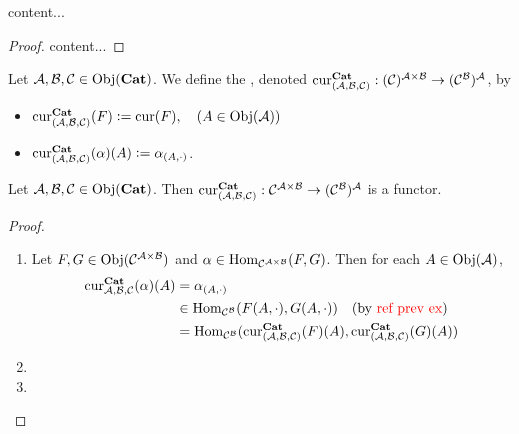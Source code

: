 \documentclass{book}
\begin{document}
	
	
	
	
	
	
	
	
	
	
	
	
	
	
	\begin{defn}
		
	\end{defn}
	
	\begin{ex}
		content...
	\end{ex}
	
	\begin{proof}
		content...
	\end{proof}
	
	\begin{defn}
		Let $\MA, \MB, \MC \in \Obj(\bCat)$. We define the , denoted $\cur^{\bCat}_{(\MA,\MB, \MC)}: (\MC)^{\MA \times \MB} \rightarrow (\MC^{\MB})^{\MA}$, by 
		\begin{itemize}
			\item $\cur^{\bCat}_{(\MA,\MB, \MC)}(F) \defeq \cur(F), \quad (A \in \Obj(\MA))$
			\item $\cur^{\bCat}_{(\MA,\MB, \MC)}(\al)(A) \defeq \al_{(A, \cdot)}$.
		\end{itemize}
	\end{defn}
	
	\begin{ex}
		Let $\MA, \MB, \MC \in \Obj(\bCat)$. Then $\cur^{\bCat}_{(\MA, \MB, \MC)}: \MC^{\MA \times \MB} \rightarrow (\MC^{\MB})^{\MA}$ is a functor. 
	\end{ex}
	
	\begin{proof}\
		\begin{enumerate}
			\item Let $F,G \in \Obj(\MC^{\MA \times \MB})$ and $\al \in \Hom_{\MC^{\MA \times \MB}}(F, G)$. Then for each $A \in \Obj(\MA)$,
			\begin{align*}
				\cur^{\bCat}_{\MA, \MB, \MC}(\al)(A)
				& = \al_{(A, \cdot)} \\
				& \in \Hom_{\MC^{\MB}}(F(A, \cdot), G(A, \cdot))  \quad \text{(by \tcr{ref prev ex})}\\
				& = \Hom_{\MC^{\MB}}(\cur^{\bCat}_{(\MA,\MB, \MC)}(F)(A), \cur^{\bCat}_{(\MA,\MB, \MC)}(G)(A)) 
			\end{align*}
			\item 
			\item 
		\end{enumerate}
	\end{proof}
	
\end{document}
